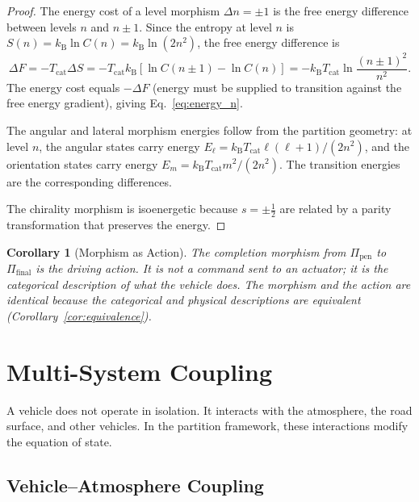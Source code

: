 \documentclass[twocolumn,10pt]{article}
\newtheorem{corollary}[theorem]{Corollary}
\newcommand{\kB}{k_{\mathrm{B}}}
\newcommand{\Tcat}{T_{\mathrm{cat}}}
\begin{document}
\begin{proof}
The energy cost of a level morphism $\Delta n = \pm 1$ is the free energy difference between levels $n$ and $n \pm 1$. Since the entropy at level $n$ is $S(n) = \kB \ln C(n) = \kB \ln(2n^2)$, the free energy difference is
\begin{equation}
\Delta F = -\Tcat \Delta S = -\Tcat \kB [\ln C(n \pm 1) - \ln C(n)] = -\kB \Tcat \ln\frac{(n \pm 1)^2}{n^2}.
\end{equation}
The energy cost equals $-\Delta F$ (energy must be supplied to transition against the free energy gradient), giving Eq.~\eqref{eq:energy_n}.

The angular and lateral morphism energies follow from the partition geometry: at level $n$, the angular states carry energy $E_{\ell} = \kB \Tcat \ell(\ell+1)/(2n^2)$, and the orientation states carry energy $E_m = \kB \Tcat m^2/(2n^2)$. The transition energies are the corresponding differences.

The chirality morphism is isoenergetic because $s = \pm \frac{1}{2}$ are related by a parity transformation that preserves the energy.
\end{proof}

\begin{corollary}[Morphism as Action]\label{cor:morphism_action}
The completion morphism from $\Pi_{\mathrm{pen}}$ to $\Pi_{\mathrm{final}}$ \emph{is} the driving action. It is not a command sent to an actuator; it is the categorical description of what the vehicle does. The morphism and the action are identical because the categorical and physical descriptions are equivalent (Corollary~\ref{cor:equivalence}).
\end{corollary}




\section{Multi-System Coupling}\label{sec:coupling}

A vehicle does not operate in isolation. It interacts with the atmosphere, the road surface, and other vehicles. In the partition framework, these interactions modify the equation of state.

\subsection{Vehicle--Atmosphere Coupling}
\end{document}
